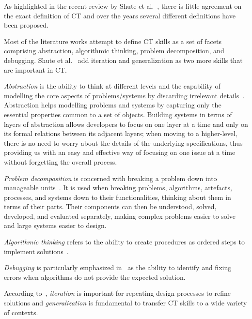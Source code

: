 As highlighted in the recent review by Shute et al.~\cite{Shute:2017}, there is little agreement on the exact definition of \ac{CT} and over the years several different definitions have been proposed.

Most of the literature works attempt to define \ac{CT} skills as a set of facets comprising abstraction, algorithmic thinking, problem decomposition, and debugging. Shute et al.~\cite{Shute:2017} add iteration and generalization as two more skills that are important in \ac{CT}.

\textit{Abstraction} is the ability to think at different levels and the capability of modelling the core aspects of problems/systems by discarding irrelevant details~\cite{Wing:2006iz}. Abstraction helps modelling problems and systems by capturing only the essential properties common to a set of objects. Building systems in terms of layers of abstraction allows developers to focus on one layer at a time and only on its formal relations between its adjacent layers; when moving to a higher-level, there is no need to worry about the details of the underlying specifications, thus providing us with an easy and effective way of focusing on one issue at a time without forgetting the overall process.

\textit{Problem decomposition} is concerned with breaking a problem down into manageable units~\cite{Wing:2006iz}. It is used when breaking problems, algorithms, artefacts, processes, and systems down to their functionalities, thinking about them in terms of their parts. Their components can then be understood, solved, developed, and evaluated separately, making complex problems easier to solve and large systems easier to design.

\textit{Algorithmic thinking} refers to the ability to create procedures as ordered steps to implement solutions~\cite{Atmatzidou:2016}.

\textit{Debugging} is particularly emphasized in~\cite{Bers:2014fk} as the ability to identify and fixing errors when algorithms do not provide the expected solution.

According to~\cite{Shute:2017}, \textit{iteration} is important for repeating design processes to refine solutions and \textit{generalization} is fundamental to transfer \ac{CT} skills to a wide variety of contexts.

